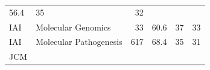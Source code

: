 \documentclass[11pt,]{article}
\begin{document}
\begin{longtable}[]{@{}llrrrr@{}}
\begin{minipage}[t]{0.08\columnwidth}
56.4\strut
\end{minipage} & \begin{minipage}[t]{0.11\columnwidth}\raggedleft\strut
35\strut
\end{minipage} & \begin{minipage}[t]{0.11\columnwidth}\raggedleft\strut
32\strut
\end{minipage}\tabularnewline
\begin{minipage}[t]{0.06\columnwidth}\raggedright\strut
IAI\strut
\end{minipage} & \begin{minipage}[t]{0.43\columnwidth}\raggedright\strut
Molecular Genomics\strut
\end{minipage} & \begin{minipage}[t]{0.04\columnwidth}\raggedleft\strut
33\strut
\end{minipage} & \begin{minipage}[t]{0.08\columnwidth}\raggedleft\strut
60.6\strut
\end{minipage} & \begin{minipage}[t]{0.11\columnwidth}\raggedleft\strut
37\strut
\end{minipage} & \begin{minipage}[t]{0.11\columnwidth}\raggedleft\strut
33\strut
\end{minipage}\tabularnewline
\begin{minipage}[t]{0.06\columnwidth}\raggedright\strut
IAI\strut
\end{minipage} & \begin{minipage}[t]{0.43\columnwidth}\raggedright\strut
Molecular Pathogenesis\strut
\end{minipage} & \begin{minipage}[t]{0.04\columnwidth}\raggedleft\strut
617\strut
\end{minipage} & \begin{minipage}[t]{0.08\columnwidth}\raggedleft\strut
68.4\strut
\end{minipage} & \begin{minipage}[t]{0.11\columnwidth}\raggedleft\strut
35\strut
\end{minipage} & \begin{minipage}[t]{0.11\columnwidth}\raggedleft\strut
31\strut
\end{minipage}\tabularnewline
\begin{minipage}[t]{0.06\columnwidth}\raggedright\strut
JCM\strut
\end{minipage} & \begin{minipage}[t]{0.43\columnwidth}\raggedright\strut

\end{minipage}
\end{longtable}
\end{document}
